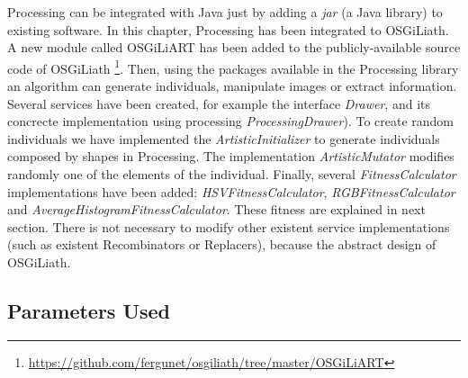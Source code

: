 {Processing %
can be integrated with Java just by adding a {\em jar} (a
Java library) to existing software. In this chapter, Processing has
been integrated to OSGiLiath. A new module called OSGiLiART has been
added to the publicly-available source code of OSGiLiath \footnote{\url{https://github.com/fergunet/osgiliath/tree/master/OSGiLiART}}.  %
Then, using the packages available in the Processing library an algorithm can generate individuals, manipulate images or extract information. Several services have been created, for example the interface {\em Drawer}, and its concrecte implementation using processing {\em ProcessingDrawer}). To create random individuals we have implemented the {\em ArtisticInitializer} to generate individuals composed by shapes in Processing. The implementation {\em ArtisticMutator} modifies randomly one of the elements of the individual. Finally, several {\em FitnessCalculator} implementations have been added: {\em HSVFitnessCalculator}, {\em RGBFitnessCalculator} and {\em AverageHistogramFitnessCalculator}. These fitness are explained in next section. There is not necessary to modify other existent service implementations (such as existent Recombinators or Replacers), because the abstract design of OSGiLiath.












\subsection{Parameters Used}

}

